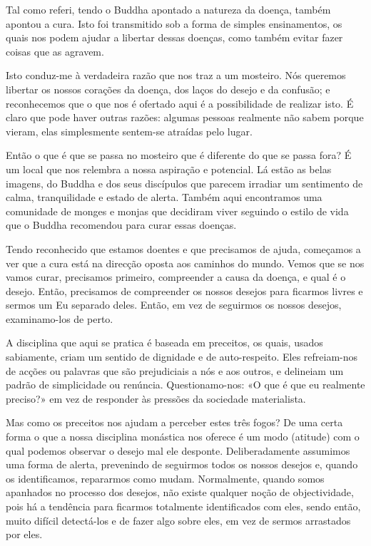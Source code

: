 Tal como referi, tendo o Buddha apontado a natureza da doença, também
apontou a cura. Isto foi transmitido sob a forma de simples
ensinamentos, os quais nos podem ajudar a libertar dessas doenças, como
também evitar fazer coisas que as agravem.

Isto conduz-me à verdadeira razão que nos traz a um mosteiro. Nós
queremos libertar os nossos corações da doença, dos laços do desejo e da
confusão; e reconhecemos que o que nos é ofertado aqui é a possibilidade
de realizar isto. É claro que pode haver outras razões: algumas pessoas
realmente não sabem porque vieram, elas simplesmente sentem-se atraídas
pelo lugar.

Então o que é que se passa no mosteiro que é diferente do que se passa
fora? É um local que nos relembra a nossa aspiração e potencial. Lá
estão as belas imagens, do Buddha e dos seus discípulos que parecem
irradiar um sentimento de calma, tranquilidade e estado de alerta.
Também aqui encontramos uma comunidade de monges e monjas que decidiram
viver seguindo o estilo de vida que o Buddha recomendou para curar essas
doenças.

Tendo reconhecido que estamos doentes e que precisamos de ajuda,
começamos a ver que a cura está na direcção oposta aos caminhos do
mundo. Vemos que se nos vamos curar, precisamos primeiro, compreender a
causa da doença, e qual é o desejo. Então, precisamos de compreender os
nossos desejos para ficarmos livres e sermos um Eu separado deles.
Então, em vez de seguirmos os nossos desejos, examinamo-los de perto.

A disciplina que aqui se pratica é baseada em preceitos, os quais,
usados sabiamente, criam um sentido de dignidade e de auto-respeito.
Eles refreiam-nos de acções ou palavras que são prejudiciais a nós e aos
outros, e delineiam um padrão de simplicidade ou renúncia.
Questionamo-nos: «O que é que eu realmente preciso?» em vez de responder
às pressões da sociedade materialista.

Mas como os preceitos nos ajudam a perceber estes três fogos? De uma
certa forma o que a nossa disciplina monástica nos oferece é um modo
(atitude) com o qual podemos observar o desejo mal ele desponte.
Deliberadamente assumimos uma forma de alerta, prevenindo de seguirmos
todos os nossos desejos e, quando os identificamos, repararmos como
mudam. Normalmente, quando somos apanhados no processo dos desejos, não
existe qualquer noção de objectividade, pois há a tendência para
ficarmos totalmente identificados com eles, sendo então, muito difícil
detectá-los e de fazer algo sobre eles, em vez de sermos arrastados por
eles.

